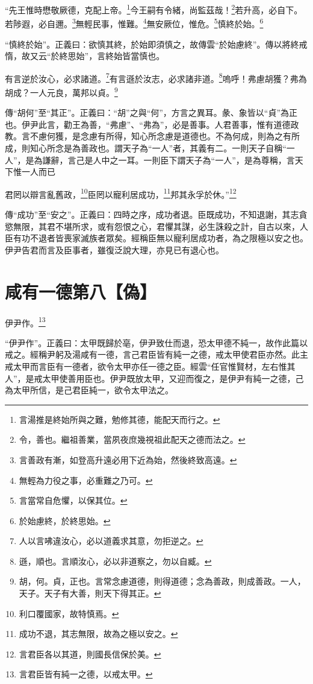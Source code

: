 “先王惟時懋敬厥德，克配上帝。\footnote{言湯推是終始所與之難，勉修其德，能配天而行之。}今王嗣有令緒，尚監茲哉！\footnote{令，善也。繼祖善業，當夙夜庶幾視祖此配天之德而法之。}若升高，必自下。若陟遐，必自邇。\footnote{言善政有漸，如登高升遠必用下近為始，然後終致高遠。}無輕民事，惟難。\footnote{無輕為力役之事，必重難之乃可。}無安厥位，惟危。\footnote{言當常自危懼，以保其位。}慎終於始。\footnote{於始慮終，於終思始。}

{\noindent\shu{}\fzkt “慎終於始”。正義曰：欲慎其終，於始即須慎之，故傳雲“於始慮終”。傳以將終戒惰，故又云“於終思始”，言終始皆當慎也。 \par}

有言逆於汝心，必求諸道。\footnote{人以言咈違汝心，必以道義求其意，勿拒逆之。}有言遜於汝志，必求諸非道。\footnote{遜，順也。言順汝心，必以非道察之，勿以自臧。}嗚呼！弗慮胡獲？弗為胡成？一人元良，萬邦以貞。\footnote{胡，何。貞，正也。言常念慮道德，則得道德；念為善政，則成善政。一人，天子。天子有大善，則天下得其正。}

{\noindent\zhuan{}\fzbyks 傳“胡何”至“其正”。正義曰：“胡”之與“何”，方言之異耳。彖、象皆以“貞”為正也。伊尹此言，勸王為善，“弗慮”、“弗為”，必是善事。人君善事，惟有道德政教。言不慮何獲，是念慮有所得，知心所念慮是道德也。不為何成，則為之有所成，則知心所念是為善政也。謂天子為“一人”者，其義有二。一則天子自稱“一人”，是為謙辭，言己是人中之一耳。一則臣下謂天子為“一人”，是為尊稱，言天下惟一人而已 \par}

君罔以辯言亂舊政，\footnote{利口覆國家，故特慎焉。}臣罔以寵利居成功，\footnote{成功不退，其志無限，故為之極以安之。}邦其永孚於休。”\footnote{言君臣各以其道，則國長信保於美。}

{\noindent\zhuan{}\fzbyks 傳“成功”至“安之”。正義曰：四時之序，成功者退。臣既成功，不知退謝，其志貪慾無限，其君不堪所求，或有怨恨之心，君懼其謀，必生誅殺之計，自古以來，人臣有功不退者皆喪家滅族者眾矣。經稱臣無以寵利居成功者，為之限極以安之也。伊尹告君而言及臣事者，雖復泛說大理，亦見已有退心也。 \par}

\section{咸有一德第八【偽】}


伊尹作。\footnote{言君臣皆有純一之德，以戒太甲。}

{\noindent\shu{}\fzkt “伊尹作”。正義曰：太甲既歸於亳，伊尹致仕而退，恐太甲德不純一，故作此篇以戒之。經稱尹躬及湯咸有一德，言己君臣皆有純一之德，戒太甲使君臣亦然。此主戒太甲而言臣有一德者，欲令太甲亦任一德之臣。經雲“任官惟賢材，左右惟其人”，是戒太甲使善用臣也。伊尹既放太甲，又迎而復之，是伊尹有純一之德，己為太甲所信，是己君臣純一，欲令太甲法之。 \par}

